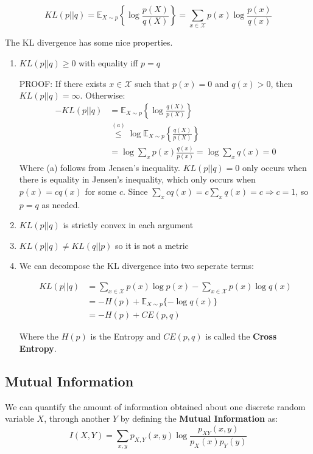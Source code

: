 \documentclass[]{article}
\theoremstyle{mattstyle}
\theoremstyle{definition}
\begin{document}
\begin{equation}
KL(p||q) = \mathbb{E}_{X\sim p}\left\{\log \frac{p(X)}{q(X)}\right\} = \sum_{x\in\mathcal{X}}p(x)\log\frac{p(x)}{q(x)}
\end{equation}

The KL divergence has some nice properties.
\begin{enumerate}
	\item $KL(p||q) \ge 0$ with equality iff $p=q$
	
	PROOF: If there exists $x \in \mathcal{X}$ such that $p(x) = 0$ and $q(x) > 0$, then $KL(p || q) = \infty$.	Otherwise:
	\begin{align*}
	-KL(p||q) &= \mathbb{E}_{X\sim p}\left\{\log \frac{q(X)}{p(X)}\right\}\\
	&\overset{(a)}{\le} \log \mathbb{E}_{X\sim p}\left\{\frac{q(X)}{p(X)}\right\} \\
	&= \log \sum_{x} p(x)\frac{q(x)}{p(x)} = \log \sum_{x} q(x) = 0
	\end{align*}
	Where (a) follows from Jensen's inequality. $KL(p||q) = 0$ only occurs when there is equality in Jensen's inequality, which only occurs when $p(x)=cq(x)$ for some $c$. Since $\sum_{x}cq(x) = c\sum_{x}q(x) = c \Rightarrow c=1$, so $p=q$ as needed.
	
	\item $KL(p||q)$ is strictly convex in each argument
	
	\item $KL(p||q) \ne KL(q||p)$ so it is not a metric
	
	\item We can decompose the KL divergence into two seperate terms:
	
	\begin{align} KL(p||q) &= \sum_{x\in\mathcal{X}}p(x)\log p(x) - \sum_{x\in\mathcal{X}}p(x)\log q(x) \\
	&= -H(p) + \mathbb{E}_{X\sim p}\{-\log q(x)\} \\
	&= -H(p) + CE(p,q)
	\end{align}
	
	Where the $H(p)$ is the Entropy and $CE(p,q)$ is called the \textbf{Cross Entropy}.
	
\end{enumerate}

\subsection{Mutual Information}
We can quantify the amount of information obtained about one discrete random variable $X$, through another $Y$ by defining the \textbf{Mutual Information} as:
\begin{equation}
I(X,Y)=\sum_{x,y}p_{X,Y}(x,y)\log\frac{p_{XY}(x,y)}{p_X(x)p_Y(y)}
\end{equation}
\end{document}
